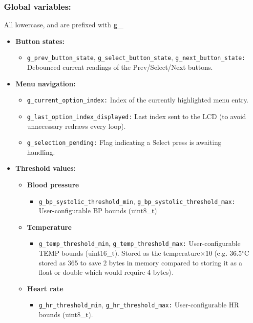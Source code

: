 \subsubsection{Global variables:}
All lowercase, and are prefixed with \textbf{g\_}
\begin{itemize}
	\item \textbf{Button states:}
	\begin{itemize}
		\item \lstinline|g_prev_button_state|, \lstinline|g_select_button_state|, \lstinline|g_next_button_state:| Debounced current readings of the Prev/Select/Next buttons.
	\end{itemize}

	\item \textbf{Menu navigation:}
	\begin{itemize}
		\item \lstinline|g_current_option_index:| Index of the currently highlighted menu entry.
		\item \lstinline|g_last_option_index_displayed:| Last index sent to the LCD (to avoid unnecessary redraws every loop).
		\item \lstinline|g_selection_pending:| Flag indicating a Select press is awaiting handling.
	\end{itemize}

	\item \textbf{Threshold values:}
	\begin{itemize}
		\item \textbf{Blood pressure}
		\begin{itemize}
			\item \lstinline|g_bp_systolic_threshold_min|, \lstinline|g_bp_systolic_threshold_max:| User-configurable BP bounds (uint8\_t)
		\end{itemize}
		\item \textbf{Temperature}
		\begin{itemize}
			\item \lstinline|g_temp_threshold_min|, \lstinline|g_temp_threshold_max:| User-configurable TEMP bounds (uint16\_t). Stored as the temperature$\times$10 (e.g. 36.5$^\circ$C stored as 365 to save 2 bytes in memory compared to storing it as a float or double which would require 4 bytes).
		\end{itemize}
		\item \textbf{Heart rate}
		\begin{itemize}
			\item \lstinline|g_hr_threshold_min|, \lstinline|g_hr_threshold_max:| User-configurable HR bounds (uint8\_t).
		\end{itemize}
	\end{itemize}


\end{itemize}
